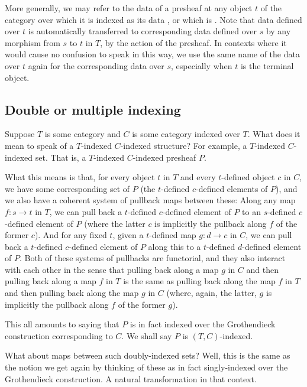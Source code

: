 
More generally, we may refer to the data of a presheaf at any object $t$ of the category over which it is indexed as its data , or which is . Note that data defined over $t$ is automatically transferred to corresponding data defined over $s$ by any morphism from $s$ to $t$ in $T$, by the action of the presheaf. In contexts where it would cause no confusion to speak in this way, we use the same name of the data over $t$ again for the corresponding data over $s$, especially when $t$ is the terminal object. 

\subsection{Double or multiple indexing}
Suppose $T$ is some category and $C$ is some category indexed over $T$. What does it mean to speak of a $T$-indexed $C$-indexed structure? For example, a $T$-indexed $C$-indexed set. That is, a $T$-indexed $C$-indexed presheaf $P$.

What this means is that, for every object $t$ in $T$ and every $t$-defined object $c$ in $C$, we have some corresponding set of $P$ (the $t$-defined $c$-defined elements of $P$), and we also have a coherent system of pullback maps between these: Along any map $f : s \to t$ in $T$, we can pull back a $t$-defined $c$-defined element of $P$ to an $s$-defined $c$-defined element of $P$ (where the latter $c$ is implicitly the pullback along $f$ of the former $c$). And for any fixed $t$, given a $t$-defined map $g : d \to c$ in $C$, we can pull back a $t$-defined $c$-defined element of $P$ along this to a $t$-defined $d$-defined element of $P$. Both of these systems of pullbacks are functorial, and they also interact with each other  in the sense that pulling back along a map $g$ in $C$ and then pulling back along a map $f$ in $T$ is the same as pulling back along the map $f$ in $T$ and then pulling back along the map $g$ in $C$ (where, again, the latter, $g$ is implicitly the pullback along $f$ of the former $g$).

This all amounts to saying that $P$ is in fact indexed over the Grothendieck construction corresponding to $C$. We shall say $P$ is $(T, C)$-indexed.

What about maps between such doubly-indexed sets? Well, this is the same as the notion we get again by thinking of these as in fact singly-indexed over the Grothendieck construction. A natural transformation in that context.

